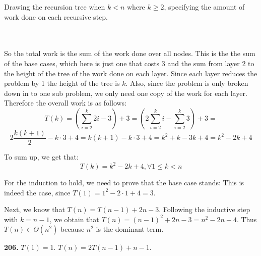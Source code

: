 \documentclass{article}
\renewcommand{\leq}{\leqslant}
\renewcommand{\geq}{\geqslant}
\begin{document}
Drawing the recursion tree when $k < n$ where $k \geq 2 $, specifying the amount of work done on each recursive step.\\\\
\\
So the total work is the sum of the work done over all nodes. This is the the sum of the base cases, which here is just one that costs $3$ and the sum from layer 2 to the height of the tree of the work done on each layer. Since each layer reduces the problem by 1 the height of the tree is $k$. Also, since the problem is only broken down in to one sub problem, we only need one copy of the work for each layer. Therefore the overall work is as follows:
$$
T(k) = \left( \sum_{i=2}^{k}{2i-3} \right) + 3 =
\left( 2\sum_{i=2}^{k}{i} - \sum_{i=2}^{k}{3} \right) + 3 = 
$$
$$
2\frac{k(k+1)}{2} - k \cdot 3 + 4 =
k(k+1) - k \cdot 3 + 4 = k^2 + k - 3k + 4 = k^2 -2k + 4$$

To sum up, we get that:
\begin{equation*}
	T(k) = k^2 - 2k + 4, \forall 1 \leq k < n
\end{equation*}

For the induction to hold, we need to prove that the base case stands:
This is indeed the case, since $T(1) = 1^2 - 2 \cdot 1 + 4 = 3$.

Next, we know that $T(n) = T(n - 1) + 2n - 3$. Following the inductive step with $k=n-1$, we obtain that $T(n)=(n-1)^2 + 2n - 3 = n^2 - 2n + 4$. Thus $T(n) \in \Theta(n^2)$ because $n^2$ is the dominant term.

\noindent\textbf{206.} $T(1) = 1$. $T(n) = 2T(n - 1) + n - 1$.
\end{document}
